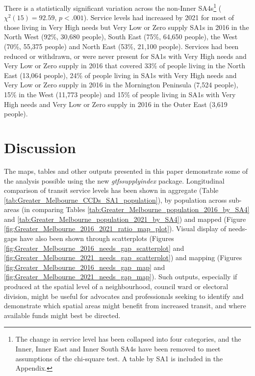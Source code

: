 \documentclass[preprint, 3p,
authoryear]{elsarticle} %
\begin{document}
There is a statistically significant variation across the non-Inner
SA4s\footnote{The change in service level has been collapsed into four
  categories, and the Inner, Inner East and Inner South SA4s have been
  removed to meet assumptions of the chi-square test. A table by SA1 is
  included in the Appendix.} (\(\chi^2(15) = 92.59\), \(p < .001\)).
Service levels had increased by 2021 for most of those living in Very
High needs but Very Low or Zero supply SA1s in 2016 in the North West
(92\%, 30,680 people), South East (75\%, 64,650 people), the West (70\%,
55,375 people) and North East (53\%, 21,100 people). Services had been
reduced or withdrawn, or were never present for SA1s with Very High
needs and Very Low or Zero supply in 2016 that covered 33\% of people
living in the North East (13,064 people), 24\% of people living in SA1s
with Very High needs and Very Low or Zero supply in 2016 in the
Mornington Peninsula (7,524 people), 15\% in the West (11,773 people)
and 15\% of people living in SA1s with Very High needs and Very Low or
Zero supply in 2016 in the Outer East (3,619 people).

\section{Discussion}\label{discussion}

The maps, tables and other outputs presented in this paper demonstrate
some of the analysis possible using the new \emph{gtfssupplyindex}
package. Longitudinal comparison of transit service levels has been
shown in aggregate (Table
\ref{tab:Greater_Melbourne_CCDs_SA1_population}), by population across
sub-areas (in comparing Tables
\ref{tab:Greater_Melbourne_population_2016_by_SA4} and
\ref{tab:Greater_Melbourne_population_2021_by_SA4}) and mapped (Figure
\ref{fig:Greater_Melbourne_2016_2021_ratio_map_plot}). Visual display of
needs-gaps have also been shown through scatterplots (Figures
\ref{fig:Greater_Melbourne_2016_needs_gap_scatterplot} and
\ref{fig:Greater_Melbourne_2021_needs_gap_scatterplot}) and mapping
(Figures \ref{fig:Greater_Melbourne_2016_needs_gap_map} and
\ref{fig:Greater_Melbourne_2021_needs_gap_map}). Such outputs,
especially if produced at the spatial level of a neighbourhood, council
ward or electoral division, might be useful for advocates and
professionals seeking to identify and demonstrate which spatial areas
might benefit from increased transit, and where available funds might
best be directed.
\end{document}
